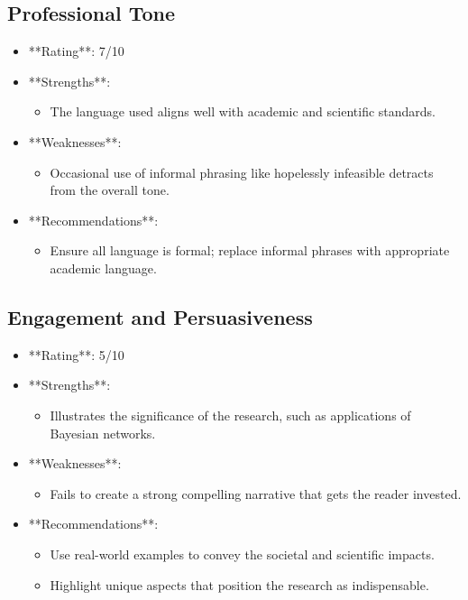 \documentclass[11pt]{article}
\begin{document}
\subsection{Professional Tone}
\begin{itemize}
    \item **Rating**: 7/10
    \item **Strengths**:
        \begin{itemize}
            \item The language used aligns well with academic and scientific standards.
        \end{itemize}
    \item **Weaknesses**:
        \begin{itemize}
            \item Occasional use of informal phrasing like hopelessly infeasible detracts from the overall tone.
        \end{itemize}
    \item **Recommendations**:
        \begin{itemize}
            \item Ensure all language is formal; replace informal phrases with appropriate academic language.
        \end{itemize}
\end{itemize}

\subsection{Engagement and Persuasiveness}
\begin{itemize}
    \item **Rating**: 5/10
    \item **Strengths**:
        \begin{itemize}
            \item Illustrates the significance of the research, such as applications of Bayesian networks.
        \end{itemize}
    \item **Weaknesses**:
        \begin{itemize}
            \item Fails to create a strong compelling narrative that gets the reader invested.
        \end{itemize}
    \item **Recommendations**:
        \begin{itemize}
            \item Use real-world examples to convey the societal and scientific impacts.
            \item Highlight unique aspects that position the research as indispensable.
        \end{itemize}
\end{itemize}
\end{document}
